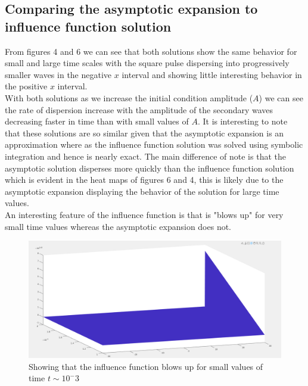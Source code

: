 \documentclass{article}
\begin{document}
\subsection{Comparing the asymptotic expansion to influence function solution}
From figures 4 and 6 we can see that both solutions show the same behavior for small and large time scales with the square pulse dispersing into progressively smaller waves in the negative $x$ interval and showing little interesting behavior in the positive $x$ interval. \\
With both solutions as we increase the initial condition amplitude ($A$) we can see the rate of dispersion increase with the amplitude of the secondary waves decreasing faster in time than with small values of $A$. It is interesting to note that these solutions are so similar given that the asymptotic expansion is an approximation where as the influence function solution was solved using symbolic integration and hence is nearly exact. The main difference of note is that the asymptotic solution disperses more quickly than the influence function solution which is evident in the heat maps of figures 6 and 4, this is likely due to the asymptotic expansion displaying the behavior of the solution for large time values. \\
An interesting feature of the influence function is that is "blows up" for very small time values whereas the asymptotic expansion does not.
\begin{figure}[H]
\centering
\includegraphics[scale=0.2]{figures/inflSmallT.png}
\caption{Showing that the influence function blows up for small values of time $t \sim 10^-3$}
\label{fig:}
\end{figure}
\end{document}
